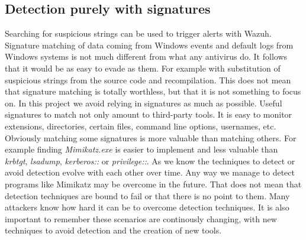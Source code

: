 \subsection{Detection purely with signatures}
Searching for suspicious strings can be used to trigger alerts with Wazuh.
Signature matching of data coming from Windows events and default logs from Windows systems is not much different from what any antivirus do. It follows that it would be as easy to evade as them. For example with substitution of suspicious strings from the source code and recompilation\cite{understanding_powersploit_mimikatz}.
\linej
\linej
This does not mean that signature matching is totally worthless, but that it is not something to focus on. In this project we avoid relying in signatures as much as possible.
Useful signatures to match not only amount to third-party tools. It is easy to monitor extensions, directories, certain files, command line options, usernames, etc.
\linej
Obviously matching some signatures is more valuable than matching others. For example finding \textit{Mimikatz.exe} is easier to implement and less valuable than \textit{krbtgt}, \textit{lsadump}, \textit{kerberos::} or \textit{privilege::}.
\linej
\linej
As we know the techniques to detect or avoid detection evolve with each other over time.
Any way we manage to detect programs like Mimikatz may be overcome in the future.
\linej
That does not mean that detection techniques are bound to fail or that there is no point to them.
Many attackers know how hard it can be to overcome detection techniques.
\linej
It is also important to remember these scenarios are continously changing, with new techniques to avoid detection and the creation of new tools.

